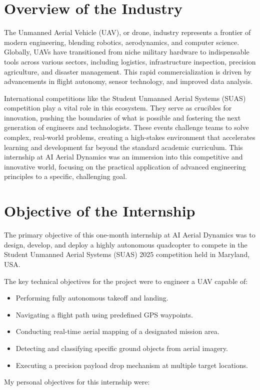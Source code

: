 \section{Overview of the Industry}

The Unmanned Aerial Vehicle (UAV), or drone, industry represents a frontier of modern engineering, blending robotics, aerodynamics, and computer science. Globally, UAVs have transitioned from niche military hardware to indispensable tools across various sectors, including logistics, infrastructure inspection, precision agriculture, and disaster management. This rapid commercialization is driven by advancements in flight autonomy, sensor technology, and improved data analysis.

International competitions like the Student Unmanned Aerial Systems (SUAS) competition play a vital role in this ecosystem. They serve as crucibles for innovation, pushing the boundaries of what is possible and fostering the next generation of engineers and technologists. These events challenge teams to solve complex, real-world problems, creating a high-stakes environment that accelerates learning and development far beyond the standard academic curriculum. This internship at AI Aerial Dynamics was an immersion into this competitive and innovative world, focusing on the practical application of advanced engineering principles to a specific, challenging goal.

\section{Objective of the Internship}
The primary objective of this one-month internship at AI Aerial Dynamics was to design, develop, and deploy a highly autonomous quadcopter to compete in the Student Unmanned Aerial Systems (SUAS) 2025 competition held in Maryland, USA.

The key technical objectives for the project were to engineer a UAV capable of:
\begin{itemize}
	\item Performing fully autonomous takeoff and landing.
	\item Navigating a flight path using predefined GPS waypoints.
	\item Conducting real-time aerial mapping of a designated mission area.
	\item Detecting and classifying specific ground objects from aerial imagery.
	\item Executing a precision payload drop mechanism at multiple target locations.
\end{itemize}
\noindent
My personal objectives for this internship were:

